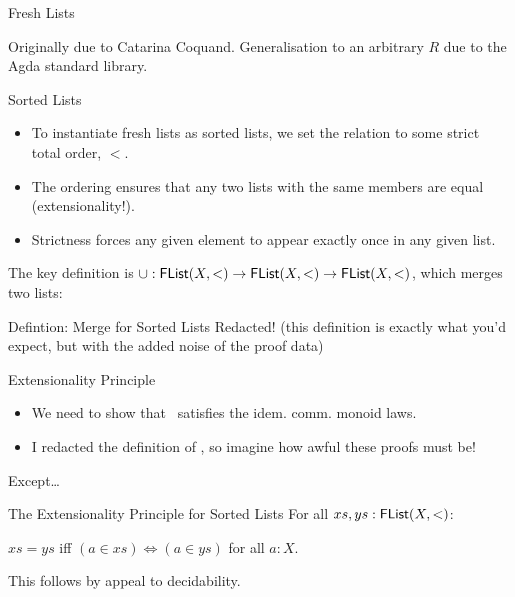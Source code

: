 \documentclass{beamer}
\newcommand{\union}{\AgdaFunction{$\cup$}}
\begin{document}
\begin{frame}{Fresh Lists}
  \snippetdatafreshlist{}

  Originally due to Catarina Coquand.
  Generalisation to an arbitrary $R$ due to the Agda standard library.
\end{frame}


\begin{frame}{Sorted Lists}

\begin{itemize}
  \item To instantiate fresh lists as sorted lists, we set the relation to some strict total order, $<$.

  \item The ordering ensures that any two lists with the same members are equal (extensionality!).

  \item Strictness forces any given element to appear exactly once in any given list.
\end{itemize}

  The key definition is $\union : \AgdaDatatype{FList}(X,<) \to \AgdaDatatype{FList}(X,<) \to \AgdaDatatype{FList}(X,<)$, which merges two lists:

  \pause
  \begin{block}{Defintion: Merge for Sorted Lists}
    Redacted! (this definition is exactly what you'd expect, but with the added noise of the proof data)
  \end{block}
\end{frame}


\begin{frame}{Extensionality Principle}
\begin{itemize}
  \item We need to show that \union~satisfies the idem. comm. monoid laws.
  \item I redacted the definition of \union, so imagine how awful these proofs must be!
\end{itemize}

\begin{center}
  Except\ldots{}
\end{center}
\pause

\begin{block}{The Extensionality Principle for Sorted Lists}
  For all $xs, ys : \AgdaDatatype{FList}(X,<)$:

  \begin{center}
    $xs = ys$ iff $(a \in xs) \iff (a \in ys)$ for all $a : X$.
  \end{center}
\end{block}

This follows by appeal to decidability.
\end{frame}
\end{document}
